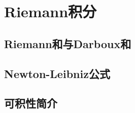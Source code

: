 \section{Riemann积分}
\subsection{Riemann和与Darboux和}
\clearpage
\subsection{Newton-Leibniz公式}
\clearpage
\subsection{可积性简介}
\clearpage

